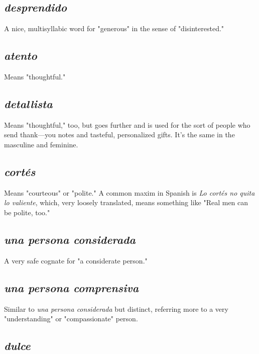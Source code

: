 \documentclass[14pt,a4paper,oneside]{memoir}
\begin{document}
\subsection{\emph{desprendido}}

A nice, multisyllabic word for "generous" in
the sense of "disinterested."

\subsection{\emph{atento}}

Means "thoughtful."

\subsection{\emph{detallista}}

Means "thoughtful," too, but goes further and is
used for the sort of people who send thank---you notes and tasteful, personalized gifts. It's the same in the masculine and feminine.

\subsection{\emph{cortés}}

Means "courteous" or "polite." A common maxim
in Spanish is \emph{Lo cortés no quita lo valiente}, which, very loosely translated, means something like "Real men can be polite, too."

\subsection{\emph{una persona considerada}}

A very safe cognate for "a considerate person."

\subsection{\emph{una persona comprensiva}}

Similar to \emph{una persona considerada} but distinct, referring more to a very "understanding" or "compassionate" person.

\subsection{\emph{dulce}}
\end{document}
